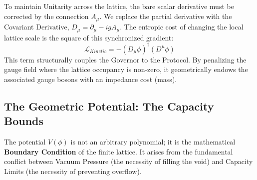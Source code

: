 To maintain Unitarity across the lattice, the bare scalar derivative must be corrected by the connection $A_\mu$. We replace the partial derivative with the Covariant Derivative, $D_\mu = \partial_\mu - igA_\mu$. The entropic cost of changing the local lattice scale is the square of this synchronized gradient:
\begin{equation}
    \mathcal{L}_{Kinetic} = -(D_\mu \phi)^\dagger (D^\mu \phi)
\end{equation}
This term structurally couples the Governor to the Protocol. By penalizing the gauge field where the lattice occupancy is non-zero, it geometrically endows the associated gauge bosons with an impedance cost (mass).

\subsection{The Geometric Potential: The Capacity Bounds}
The potential $V(\phi)$ is not an arbitrary polynomial; it is the mathematical \textbf{Boundary Condition} of the finite lattice. It arises from the fundamental conflict between Vacuum Pressure (the necessity of filling the void) and Capacity Limits (the necessity of preventing overflow).

